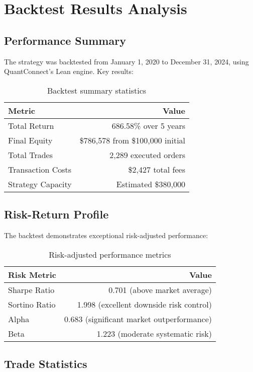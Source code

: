 \documentclass[onecolumn,11pt]{IEEEtran}
\begin{document}
\section{Backtest Results Analysis}

\subsection{Performance Summary}

The strategy was backtested from January 1, 2020 to December 31, 2024, using QuantConnect's Lean engine. Key results:

\begin{table}[h]
\centering
\begin{tabular}{lr}
\toprule
\textbf{Metric} & \textbf{Value} \\
\midrule
Total Return & 686.58\% over 5 years \\
Final Equity & \$786,578 from \$100,000 initial \\
Total Trades & 2,289 executed orders \\
Transaction Costs & \$2,427 total fees \\
Strategy Capacity & Estimated \$380,000 \\
\bottomrule
\end{tabular}
\caption{Backtest summary statistics}
\end{table}

\subsection{Risk-Return Profile}

The backtest demonstrates exceptional risk-adjusted performance:

\begin{table}[h]
\centering
\begin{tabular}{lr}
\toprule
\textbf{Risk Metric} & \textbf{Value} \\
\midrule
Sharpe Ratio & 0.701 (above market average) \\
Sortino Ratio & 1.998 (excellent downside risk control) \\
Alpha & 0.683 (significant market outperformance) \\
Beta & 1.223 (moderate systematic risk) \\
\bottomrule
\end{tabular}
\caption{Risk-adjusted performance metrics}
\end{table}

\subsection{Trade Statistics}
\end{document}
